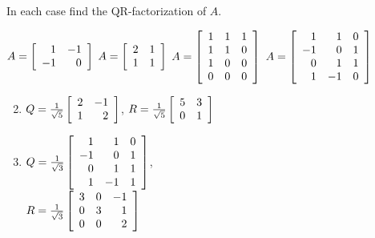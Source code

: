 \begin{multicols}{2}
\begin{ex}
In each case find the QR-factorization of $A$.


\begin{exenumerate}[column-sep=-15pt]
\exitem $A = \left[ \begin{array}{rr}
1 & -1 \\
-1 & 0
\end{array}\right]$
\exitem $A = \left[ \begin{array}{rr}
2 & 1 \\
1 &1
\end{array}\right]$
\exitem $A = \left[ \begin{array}{rrr}
1 & 1 & 1 \\
1 & 1 & 0 \\
1 & 0 & 0 \\
0 & 0 & 0 
\end{array}\right]$
\exitem $A = \left[ \begin{array}{rrr}
1 & 1 & 0 \\
-1 & 0 & 1 \\
0 & 1 & 1 \\
1 & -1 & 0 
\end{array}\right]$
\end{exenumerate}
\begin{sol}
\begin{enumerate}[label={\alph*.}]
\setcounter{enumi}{1}
\item  $Q = \tfrac{1}{\sqrt{5}}\left[ \begin{array}{rr}
2 & -1 \\
1 & 2 
\end{array}\right]$,
 $R = \tfrac{1}{\sqrt{5}}\left[ \begin{array}{rr}
5 & 3 \\
0 & 1 
\end{array}\right]$

\setcounter{enumi}{3}
\item  $Q = \tfrac{1}{\sqrt{3}}\left[ \begin{array}{rrr}
1 & 1 & 0 \\
-1 & 0 & 1 \\
0 & 1 & 1 \\
1 & -1 & 1
\end{array}\right]$, \\
$R = \tfrac{1}{\sqrt{3}}\left[ \begin{array}{rrr}
3 & 0 & -1 \\
0 & 3 & 1 \\
0 & 0 & 2 
\end{array}\right]$


\end{enumerate}
\end{sol}
\end{ex}
\end{multicols}
